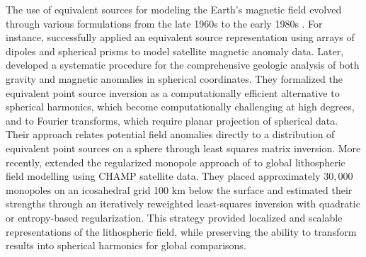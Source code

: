 \documentclass[onecolumn,10pt,a4paper]{article}
\providecommand{\DIFdelbegin}{} %
\providecommand{\DIFdelend}{} %
\newcommand{\DIFscaledelfig}{0.5}
\newlength{\DIFdelgraphicswidth} %
\newlength{\DIFdelgraphicsheight} %
\newcommand{\DIFdelincludegraphics}[2][]{%
\sbox{\DIFdelgraphicsbox}{\DIFOincludegraphics[#1]{#2}}%
\settoboxwidth{\DIFdelgraphicswidth}{\DIFdelgraphicsbox} %
\settoboxtotalheight{\DIFdelgraphicsheight}{\DIFdelgraphicsbox} %
\scalebox{\DIFscaledelfig}{%
\parbox[b]{\DIFdelgraphicswidth}{\usebox{\DIFdelgraphicsbox}\\[-\baselineskip] \rule{\DIFdelgraphicswidth}{0em}}\llap{\resizebox{\DIFdelgraphicswidth}{\DIFdelgraphicsheight}{%
\setlength{\unitlength}{\DIFdelgraphicswidth}%
\begin{picture}(1,1)%
\thicklines\linethickness{2pt} %
{\color[rgb]{1,0,0}\put(0,0){\framebox(1,1){}}}%
{\color[rgb]{1,0,0}\put(0,0){\line( 1,1){1}}}%
{\color[rgb]{1,0,0}\put(0,1){\line(1,-1){1}}}%
\end{picture}%
}\hspace*{3pt}}} %
} %
\DeclareRobustCommand{\DIFdelbegin}{\DIFOdelbegin \let\includegraphics\DIFdelincludegraphics} %
\DeclareRobustCommand{\DIFdelend}{\DIFOaddend \let\includegraphics\DIFOincludegraphics} %
\begin{document}
\DIFdelbegin %

\DIFdelend The use of equivalent sources for modeling the Earth's magnetic field evolved through
various formulations from the late 1960s to the early 1980s
\citep{Alldredge1969, Mayhew1979, Mayhew1980, Reilly1978, Mayhew1982}.
For instance, \citet{Mayhew1979} successfully applied an equivalent source
representation using arrays of dipoles and spherical prisms to model
satellite magnetic anomaly data. Later,
\citet{VonFrese1981} developed a systematic procedure for the comprehensive
geologic analysis of both gravity and magnetic anomalies in spherical
coordinates. They formalized the equivalent point source inversion as a
computationally efficient alternative to spherical harmonics, which become
computationally challenging at high degrees, and to Fourier transforms, which require planar
projection of spherical data. Their approach relates potential field anomalies
directly to a distribution of equivalent point sources on a sphere through
least squares matrix inversion.
More recently, \citet{Kother2015} extended the regularized monopole
approach of \citet{Obrien1994} to global lithospheric field modelling
using CHAMP satellite data. They placed approximately $30,000$ monopoles on
an icosahedral grid 100 km below the surface and estimated their
strengths through an iteratively reweighted least-squares inversion with
quadratic or entropy-based regularization. This strategy provided
localized and scalable representations of the lithospheric field, while
preserving the ability to transform results into spherical harmonics for
global comparisons.
\end{document}
